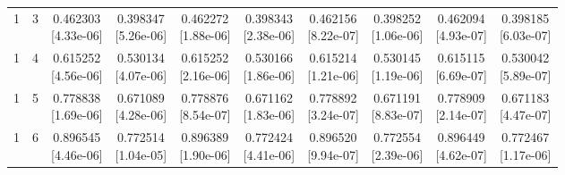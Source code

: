 \documentclass[12pt,letterpaper]{article}
\theoremstyle{plain}
\theoremstyle{definition}
\begin{document}
\begin{table}[p]
\begin{adjustbox}{max width=\linewidth}
\begin{tabular}{@{}rr*{8}{c}@{}}
1 & 3 & \shortstack{0.462303\\[-1pt]{\scriptsize[4.33e-06]}} & \shortstack{0.398347\\[-1pt]{\scriptsize[5.26e-06]}} & \shortstack{0.462272\\[-1pt]{\scriptsize[1.88e-06]}} & \shortstack{0.398343\\[-1pt]{\scriptsize[2.38e-06]}} & \shortstack{0.462156\\[-1pt]{\scriptsize[8.22e-07]}} & \shortstack{0.398252\\[-1pt]{\scriptsize[1.06e-06]}} & \shortstack{0.462094\\[-1pt]{\scriptsize[4.93e-07]}} & \shortstack{0.398185\\[-1pt]{\scriptsize[6.03e-07]}}\\
1 & 4 & \shortstack{0.615252\\[-1pt]{\scriptsize[4.56e-06]}} & \shortstack{0.530134\\[-1pt]{\scriptsize[4.07e-06]}} & \shortstack{0.615252\\[-1pt]{\scriptsize[2.16e-06]}} & \shortstack{0.530166\\[-1pt]{\scriptsize[1.86e-06]}} & \shortstack{0.615214\\[-1pt]{\scriptsize[1.21e-06]}} & \shortstack{0.530145\\[-1pt]{\scriptsize[1.19e-06]}} & \shortstack{0.615115\\[-1pt]{\scriptsize[6.69e-07]}} & \shortstack{0.530042\\[-1pt]{\scriptsize[5.89e-07]}}\\
1 & 5 & \shortstack{0.778838\\[-1pt]{\scriptsize[1.69e-06]}} & \shortstack{0.671089\\[-1pt]{\scriptsize[4.28e-06]}} & \shortstack{0.778876\\[-1pt]{\scriptsize[8.54e-07]}} & \shortstack{0.671162\\[-1pt]{\scriptsize[1.83e-06]}} & \shortstack{0.778892\\[-1pt]{\scriptsize[3.24e-07]}} & \shortstack{0.671191\\[-1pt]{\scriptsize[8.83e-07]}} & \shortstack{0.778909\\[-1pt]{\scriptsize[2.14e-07]}} & \shortstack{0.671183\\[-1pt]{\scriptsize[4.47e-07]}}\\
1 & 6 & \shortstack{0.896545\\[-1pt]{\scriptsize[4.46e-06]}} & \shortstack{0.772514\\[-1pt]{\scriptsize[1.04e-05]}} & \shortstack{0.896389\\[-1pt]{\scriptsize[1.90e-06]}} & \shortstack{0.772424\\[-1pt]{\scriptsize[4.41e-06]}} & \shortstack{0.896520\\[-1pt]{\scriptsize[9.94e-07]}} & \shortstack{0.772554\\[-1pt]{\scriptsize[2.39e-06]}} & \shortstack{0.896449\\[-1pt]{\scriptsize[4.62e-07]}} & \shortstack{0.772467\\[-1pt]{\scriptsize[1.17e-06]}}\\

\end{tabular}
\end{adjustbox}
\end{table}
\end{document}
